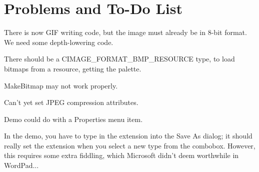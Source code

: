 \chapter{Problems and To-Do List}\label{problems}
%
\setfooter{\thepage}{}{}{}{}{\thepage}%

There is now GIF writing code, but the image must already be in 8-bit format. We need
some depth-lowering code.

There should be a CIMAGE\_FORMAT\_BMP\_RESOURCE type, to load bitmaps
from a resource, getting the palette.

MakeBitmap may not work properly.

Can't yet set JPEG compression attributes.

Demo could do with a Properties menu item.

In the demo, you have to type in the extension into the Save As dialog;
it should really set the extension when you select a new type from the
combobox. However, this requires some extra fiddling, which Microsoft
didn't deem worthwhile in WordPad...
